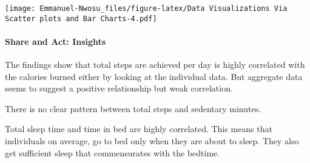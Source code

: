 \documentclass[
]{article}
\begin{document}
\texttt{[image: Emmanuel-Nwosu\_files/figure-latex/Data Visualizations Via Scatter plots and Bar Charts-4.pdf]}

\paragraph{Share and Act: Insights}\label{share-and-act-insights}

The findings show that total steps are achieved per day is highly
correlated with the calories burned either by looking at the individual
data. But aggregate data seems to suggest a positive relationship but
weak correlation.

There is no clear pattern between total steps and sedentary minutes.

Total sleep time and time in bed are highly correlated. This means that
individuals on average, go to bed only when they are about to sleep.
They also get sufficient sleep that commensurates with the bedtime.
\end{document}
